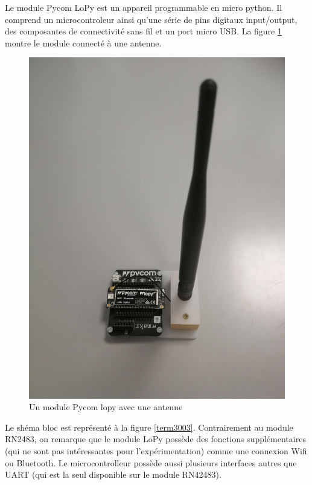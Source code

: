 Le module Pycom LoPy \footnotemark[11] est un appareil programmable en micro python. Il comprend un microcontroleur ainsi qu'une série de pins digitaux input/output,  des composantes de connectivité sans fil et un port micro \ac{USB}. La figure \ref{term35} montre le module  connecté à une antenne.

\newpage

\begin{figure}[h]
\centering

\includegraphics[scale=0.08]{images/lopy.png}
\caption{Un module Pycom lopy avec une antenne}\label{term35}
\end{figure}


Le shéma bloc \footnotemark[11]  est représenté à la figure \ref{term3003}. Contrairement au module RN2483, on remarque que le module LoPy possède des fonctions supplémentaires 
(qui ne sont pas intéressantes pour l'expérimentation) comme une connexion Wifi ou Bluetooth. Le microcontrolleur possède aussi plusieurs interfaces autres que UART (qui est la seul disponible sur le module RN42483).

